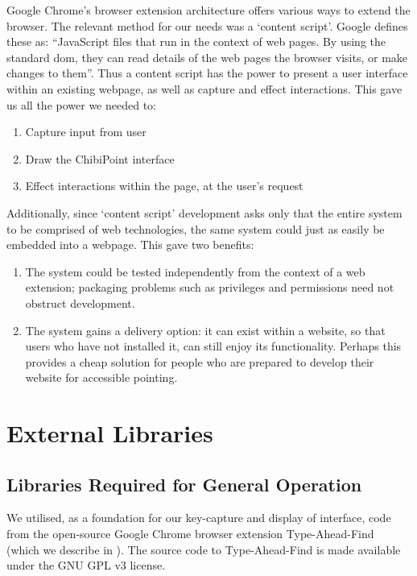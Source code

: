 \documentclass[a4paper, 12pt]{report}
\begin{document}
Google Chrome's browser extension architecture offers various ways to extend the browser. The relevant method for our needs was a `content script'\cite{contentscript}. Google defines these as: ``JavaScript files that run in the context of web pages. By using the standard \gls{dom}, they can read details of the web pages the browser visits, or make changes to them''.
Thus a content script has the power to present a user interface within an existing webpage, as well as capture and effect interactions. This gave us all the power we needed to:

\begin{enumerate}
\item Capture input from user
\item Draw the ChibiPoint interface
\item Effect interactions within the page, at the user's request
\end{enumerate}

Additionally, since `content script' development asks only that the entire system to be comprised of web technologies, the same system could just as easily be embedded into a webpage. This gave two benefits:

\begin{enumerate}
\item The system could be tested independently from the context of a web extension; packaging problems such as privileges and permissions need not obstruct development.
\item The system gains a delivery option: it can exist within a website, so that users who have not installed it, can still enjoy its functionality. Perhaps this provides a cheap solution for people who are prepared to develop their website for accessible pointing.
\end{enumerate}

\section{External Libraries}
\subsection{Libraries Required for General Operation}
We utilised, as a foundation for our key-capture and display of interface, code from the open-source Google Chrome browser extension Type-Ahead-Find~\cite{typeaheadfind,typeaheadfindsource} (which we describe in ). The source code to Type-Ahead-Find is made available under the GNU GPL v3\cite{gnugpl} license.
\end{document}
